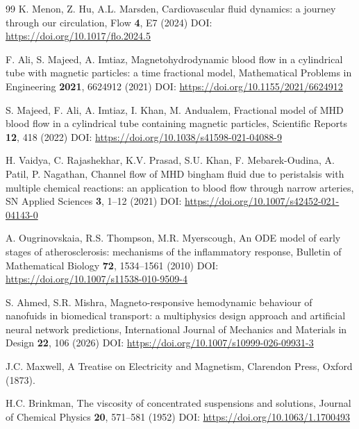 \documentclass[10pt]{NSP1}
\begin{document}
\begin{thebibliography}{99}
		K. Menon, Z. Hu, A.L. Marsden, Cardiovascular fluid dynamics: a journey through our circulation, Flow \textbf{4}, E7 (2024) DOI: \url{https://doi.org/10.1017/flo.2024.5}
		
		F. Ali, S. Majeed, A. Imtiaz, Magnetohydrodynamic blood flow in a cylindrical tube with magnetic particles: a time fractional model, Mathematical Problems in Engineering \textbf{2021}, 6624912 (2021) DOI: \url{https://doi.org/10.1155/2021/6624912}
		
		S. Majeed, F. Ali, A. Imtiaz, I. Khan, M. Andualem, Fractional model of MHD blood flow in a cylindrical tube containing magnetic particles, Scientific Reports \textbf{12}, 418 (2022) DOI: \url{https://doi.org/10.1038/s41598-021-04088-9}
		
		H. Vaidya, C. Rajashekhar, K.V. Prasad, S.U. Khan, F. Mebarek-Oudina, A. Patil, P. Nagathan, Channel flow of MHD bingham fluid due to peristalsis with multiple chemical reactions: an application to blood flow through narrow arteries, SN Applied Sciences \textbf{3}, 1--12 (2021) DOI: \url{https://doi.org/10.1007/s42452-021-04143-0}
		
		A. Ougrinovskaia, R.S. Thompson, M.R. Myerscough, An ODE model of early stages of atherosclerosis: mechanisms of the inflammatory response, Bulletin of Mathematical Biology \textbf{72}, 1534--1561 (2010) DOI: \url{https://doi.org/10.1007/s11538-010-9509-4}
		
		S. Ahmed, S.R. Mishra, Magneto-responsive hemodynamic behaviour of nanofuids in biomedical transport: a multiphysics design approach and artificial neural network predictions, International Journal of Mechanics and Materials in Design \textbf{22}, 106 (2026) DOI: \url{https://doi.org/10.1007/s10999-026-09931-3}
		
		J.C. Maxwell, A Treatise on Electricity and Magnetism, Clarendon Press, Oxford (1873).
		
		H.C. Brinkman, The viscosity of concentrated suspensions and solutions, Journal of Chemical Physics \textbf{20}, 571--581 (1952) DOI: \url{https://doi.org/10.1063/1.1700493}
		
	\end{thebibliography}
	
\end{document}
